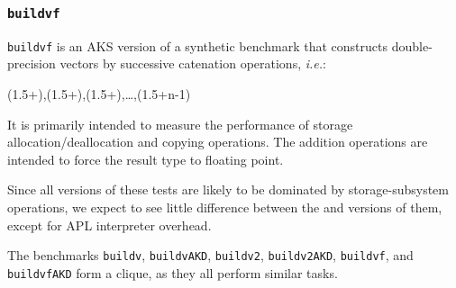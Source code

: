 \subsubsection{\tt buildvf}
\label{benchmarkbuildvf}

{\tt buildvf} is an AKS version of a synthetic benchmark that constructs 
double-precision vectors by successive catenation operations, {\em i.e.}:

 {\apl (1.5+\qiota{}),(1.5+\qiota{}),(1.5+\qiota{}),\dots,(1.5+\qiota\0n-1)}

\noindent It is primarily intended to measure the
performance of storage allocation/deallocation and
copying operations. The addition operations are
intended to force the result type to floating point.

Since all versions of these tests are likely to be dominated
by storage-subsystem operations, we expect to see little
difference between the \dapl and \sac versions of them,
except for APL interpreter overhead.

The benchmarks {\tt buildv}, {\tt buildvAKD}, {\tt buildv2}, {\tt buildv2AKD},
{\tt buildvf}, and {\tt buildvfAKD} form a clique, as they
all perform similar tasks.
